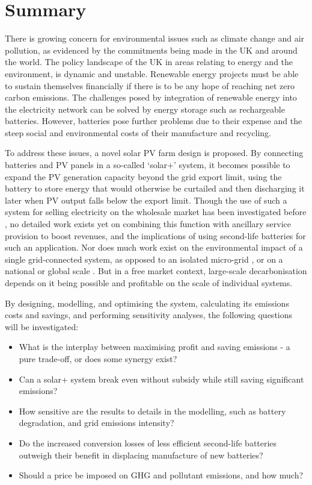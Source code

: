 \documentclass[report_18month.tex]{subfiles}
\begin{document}
\section{Summary}
There is growing concern for environmental issues such as climate change and air pollution, as evidenced by the commitments being made in the UK and around the world. The policy landscape of the UK in areas relating to energy and the environment, is dynamic and unstable. Renewable energy projects must be able to sustain themselves financially if there is to be any hope of reaching net zero carbon emissions. The challenges posed by integration of renewable energy into the electricity network can be solved by energy storage such as rechargeable batteries. However, batteries pose further problems due to their expense and the steep social and environmental costs of their manufacture and recycling.

To address these issues, a novel solar PV farm design is proposed. By connecting batteries and PV panels in a so-called `solar+' system, it becomes possible to expand the PV generation capacity beyond the grid export limit, using the battery to store energy that would otherwise be curtailed and then discharging it later when PV output falls below the export limit. Though the use of such a system for selling electricity on the wholesale market has been investigated before \citep{zhang2017sweden}, no detailed work exists yet on combining this function with ancillary service provision to boost revenues, and the implications of using second-life batteries for such an application. Nor does much work exist on the environmental impact of a single grid-connected system, as opposed to an isolated micro-grid \citep{fadaee2012standalone,stadler2009expensiveco2}, or on a national or global scale \citep{strbac2012strategic,bussar2016eu,carbajales2014storage}. But in a free market context, large-scale decarbonisation depends on it being possible and profitable on the scale of individual systems.

By designing, modelling, and optimising the system, calculating its emissions costs and savings, and performing sensitivity analyses, the following questions will be investigated:
\begin{itemize}
\item What is the interplay between maximising profit and saving emissions - a pure trade-off, or does some synergy exist?
\item Can a solar+ system break even without subsidy while still saving significant emissions?
\item How sensitive are the results to details in the modelling, such as battery degradation, and grid emissions intensity?
\item Do the increased conversion losses of less efficient second-life batteries outweigh their benefit in displacing manufacture of new batteries?
\item Should a price be imposed on GHG and pollutant emissions, and how much?
\end{itemize}
\end{document}
